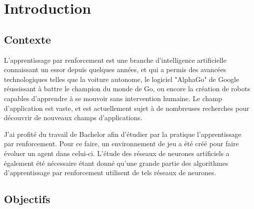 \documentclass[11pt,a4paper]{report}
\title{\vartitle}
\author{\varauthor}
\date{\vardate}
\begin{document}
  \begin{titlepage}
    \maketitle

    \thispagestyle{empty}

    \begin{abstract}
    // TODO
    \end{abstract}


  \end{titlepage}
  
  \newpage
  
  \tableofcontents
  
  \newpage

  \chapter{Introduction}
  
  \section{Contexte}
  
  \par L'apprentissage par renforcement est une branche d'intelligence artificielle connaissant un essor depuis quelques années, et qui a permis des avancées technologiques telles que la voiture autonome, le logiciel "AlphaGo" de Google réussissant à battre le champion du monde de Go, ou encore la création de robots capables d'apprendre à se mouvoir sans intervention humaine. Le champ d'application est vaste, et est actuellement sujet à de nombreuses recherches pour découvrir de nouveaux champs d'applications. 
  
  \par J'ai profité du travail de Bachelor afin d'étudier par la pratique l'apprentissage par renforcement. Pour ce faire, un environnement de jeu a été créé pour faire évoluer un agent dans celui-ci. L'étude des réseaux de neurones artificiels a également été nécessaire étant donné qu'une grande partie des algorithmes d'apprentissage par renforcement utilisent de tels réseaux de neurones. 
  
  \section{Objectifs}
  
\end{document}
